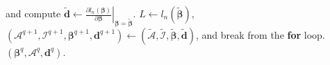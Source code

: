 \begin{algorithm}[htbp]
\begin{algorithmic}[1]
and compute
$\tilde{\boldsymbol d} \leftarrow \left.\frac{\partial l_n( \boldsymbol \beta )}{\partial \boldsymbol \beta}\right|_{\boldsymbol \beta = \tilde{\boldsymbol \beta} }.$
\STATE $L \leftarrow l_n(\tilde{\boldsymbol \beta} )$, $({\mathcal{A}^{q+1}} , {\mathcal{I}^{q+1}} , {\boldsymbol \beta}^{q+1}, {\boldsymbol d}^{q+1}) \leftarrow (\tilde{\mathcal{A}} ,\tilde{\mathcal{I}} , \tilde{\boldsymbol\beta}, \tilde{\boldsymbol d })$, and break from the \textbf{for} loop.
\ENDIF
\ENDFOR
{}
\ENSURE $(\boldsymbol \beta^{q}, \mathcal{A}^{q}, \boldsymbol{d}^{q})$.
\end{algorithmic}
\end{algorithm}
